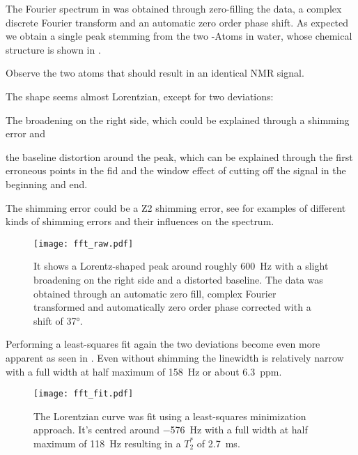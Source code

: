The Fourier spectrum in  was obtained through zero-filling the data, a complex discrete Fourier transform and an automatic zero order phase shift. As expected we obtain a single peak stemming from the two -Atoms in water, whose chemical structure is shown in .

\begin{marginfigure}
    \centering
    
    \caption{ Observe the two  atoms that should result in an identical NMR signal.}
\end{marginfigure}

The shape seems almost Lorentzian, except for two deviations: %
\begin{enumerate*}[label=(\arabic*)]
    \item The broadening on the right side, which could be explained through a shimming error and
    \item the baseline distortion around the peak, which can be explained through the first erroneous points in the \acrshort{fid} and the window effect of cutting off the signal in the beginning and end.
\end{enumerate*}%
The shimming error could be a Z2 shimming error, see  for examples of different kinds of shimming errors and their influences on the spectrum.

\begin{figure}[h!bt]
    \centering
    \texttt{[image: fft\_raw.pdf]}
    \caption{ It shows a Lorentz-shaped peak around roughly \qty{600}{\hertz} with a slight broadening on the right side and a distorted baseline. The data was obtained through an automatic zero fill, complex Fourier transformed and automatically zero order phase corrected with a shift of \ang{37}.}
\end{figure}

Performing a least-squares fit again the two deviations become even more apparent as seen in . Even without shimming the linewidth is relatively narrow with a full width at half maximum of \qty{158}{\hertz} or about \qty{6.3}{ppm}.

\begin{figure}[h!bt]
    \centering
    \texttt{[image: fft\_fit.pdf]}
    \caption{ The Lorentzian curve was fit using a least-squares minimization approach. It's centred around \qty{-576}{\hertz} with a full width at half maximum of \qty{118}{\hertz} resulting in a \(T_2^*\) of \qty{2.7}{\milli\second}.}
\end{figure}

